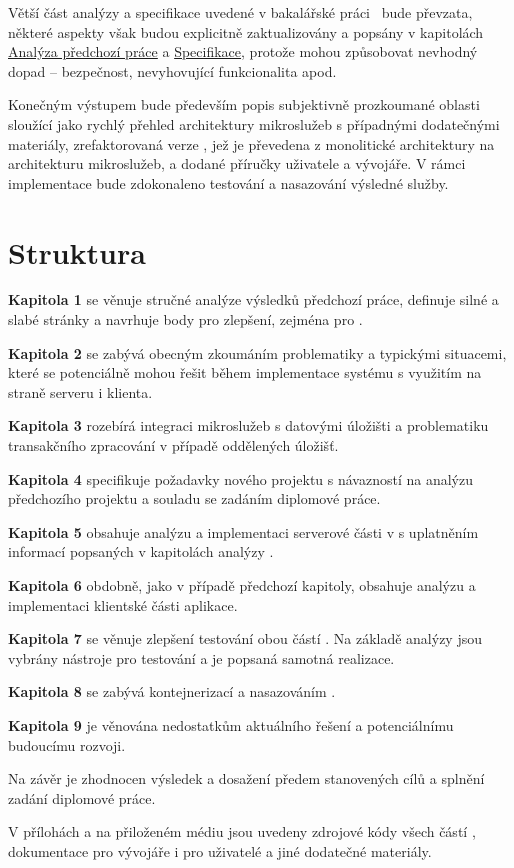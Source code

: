 Větší část analýzy a specifikace uvedené v bakalářské práci~\cite{bachelorthesis} bude převzata, některé aspekty však budou explicitně zaktualizovány a popsány v kapitolách \hyperref[ch:analysis]{Analýza předchozí práce} a \hyperref[ch:specification]{Specifikace}, protože mohou způsobovat nevhodný dopad – bezpečnost, nevyhovující funkcionalita apod.

Konečným výstupem bude především popis subjektivně prozkoumané oblasti  sloužící jako rychlý přehled architektury mikroslužeb s případnými dodatečnými materiály, zrefaktorovaná verze , jež je převedena z monolitické architektury na architekturu mikroslužeb, a dodané příručky uživatele a vývojáře.
V rámci implementace bude zdokonaleno testování a nasazování výsledné služby.


\clearpage



\section{Struktura}\label{sec:struktura}

\textbf{Kapitola 1} se věnuje stručné analýze výsledků předchozí práce, definuje silné a slabé stránky a navrhuje body pro zlepšení, zejména pro .

\textbf{Kapitola 2} se zabývá obecným zkoumáním problematiky  a typickými situacemi, které se potenciálně mohou řešit během implementace systému s využitím  na straně serveru i klienta.

\textbf{Kapitola 3} rozebírá integraci mikroslužeb s datovými úložišti a problematiku transakčního zpracování v případě oddělených úložišť.

\textbf{Kapitola 4} specifikuje požadavky nového projektu s návazností na analýzu předchozího projektu a souladu se zadáním diplomové práce.

\textbf{Kapitola 5} obsahuje analýzu a implementaci serverové části  v  s uplatněním informací popsaných v kapitolách analýzy .

\textbf{Kapitola 6} obdobně, jako v případě předchozí kapitoly, obsahuje analýzu a implementaci klientské části aplikace.

\textbf{Kapitola 7} se věnuje zlepšení testování obou částí .
Na základě analýzy  jsou vybrány nástroje pro testování a je popsaná samotná realizace.

\textbf{Kapitola 8} se zabývá kontejnerizací a nasazováním .

\textbf{Kapitola 9} je věnována nedostatkům aktuálního řešení a potenciálnímu budoucímu rozvoji.

Na závěr je zhodnocen výsledek a dosažení předem stanovených cílů a splnění zadání diplomové práce.

V přílohách a na přiloženém médiu jsou uvedeny zdrojové kódy všech částí , dokumentace pro vývojáře i pro uživatelé a jiné dodatečné materiály.
